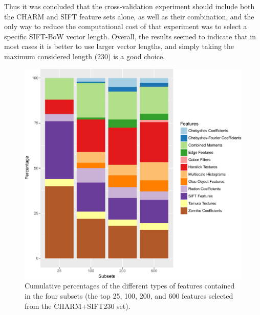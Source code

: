 Thus it was concluded that the cross-validation experiment should include both the CHARM and SIFT feature sets alone, as well as their combination, and the only way to reduce the computational cost of that experiment was to select a specific SIFT-BoW vector length. Overall, the results seemed to indicate that in most cases it is better to use larger vector lengths, and simply taking the maximum considered length (230) is a good choice.
\begin{figure}[h!]
	\centering
	\includegraphics[width=\columnwidth]{fig07}
	\caption{Cumulative percentages of the different types of features contained in the four subsets (the top 25, 100, 200, and 600 features selected from the CHARM+SIFT230 set).}
	\label{fig:subsetFS}
\end{figure}
